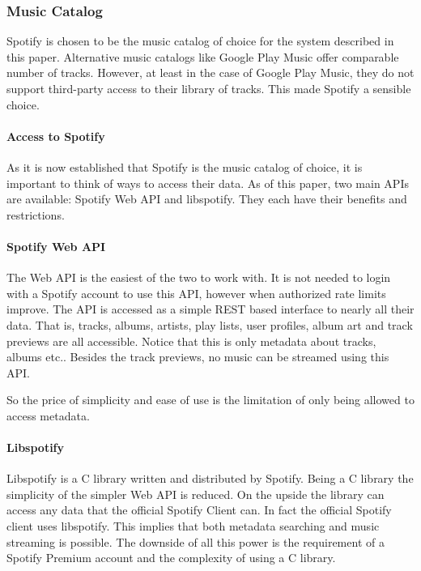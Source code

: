 \subsubsection{Music Catalog}
\label{ssub:Music_catalog}


Spotify is chosen to be the music catalog of choice for the system described in this paper. Alternative music catalogs like Google Play Music offer comparable number of tracks. However, at least in the case of Google Play Music, they do not support third-party access to their library of tracks. This made Spotify a sensible choice.

\paragraph{Access to Spotify}
\label{par:Access_to_Spotify}

As it is now established that Spotify is the music catalog of choice, it is important to think of ways to access their data. As of this paper, two main APIs are available: Spotify Web API and libspotify. They each have their benefits and restrictions.

\paragraph{Spotify Web API}
\label{par:spotify_web_api}

The Web API is the easiest of the two to work with. It is not needed to login with a Spotify account to use this API, however when authorized rate limits improve. The API is accessed as a simple REST based interface to nearly all their data. That is, tracks, albums, artists, play lists, user profiles, album art and track previews are all accessible. Notice that this is only metadata about tracks, albums etc.. Besides the track previews, no music can be streamed using this API.

So the price of simplicity and ease of use is the limitation of only being allowed to access metadata. 

\paragraph{Libspotify}
\label{par:libspotify}

Libspotify is a C library written and distributed by Spotify. Being a C library the simplicity of the simpler Web API is reduced. On the upside the library can access any data that the official Spotify Client can. In fact the official Spotify client uses libspotify. This implies that both metadata searching and music streaming is possible. The downside of all this power is the requirement of a Spotify Premium account and the complexity of using a C library.


